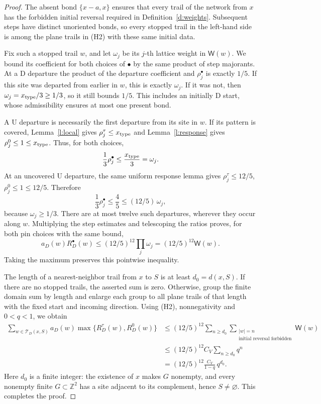 \begin{proof}
The absent bond \(\{x-a,x\}\) ensures that every trail of the
network from \(x\) has the forbidden initial reversal required
in Definition~\ref{d:weights}. Subsequent steps have distinct
unoriented bonds, so every stopped trail in the left-hand side
is among the plane trails in (H2) with these same initial data.

Fix such a stopped trail \(w\), and let \(\omega_j\) be its
\(j\)-th lattice weight in \(\mathsf W(w)\).
We bound its coefficient for both choices of \(\bullet\)
by the same product of step majorants.
At a \(\mathrm D\) departure the product of the departure
coefficient and \(\rho_j^\bullet\) is exactly \(1/5\).
If this site was departed from earlier in \(w\), this is
exactly \(\omega_j\). If it was not, then
\(\omega_j=x_{\rm type}/3\ge1/3\), so it still bounds \(1/5\).
This includes an initially \(\mathrm D\) start, whose
admissibility ensures at most one present bond.

A \(\mathrm U\) departure is necessarily the first departure
from its site in \(w\). If its pattern is covered,
Lemma~\ref{l:local} gives \(\rho_j^\tau\le x_{\rm type}\)
and Lemma~\ref{l:response} gives
\(\rho_j^0\le1\le x_{\rm type}\). Thus, for both choices,
\[
 \frac13\rho_j^\bullet\le\frac{x_{\rm type}}3=\omega_j.
\]
At an uncovered \(\mathrm U\) departure, the same uniform
response lemma gives \(\rho_j^\tau\le12/5\),
\(\rho_j^0\le1\le12/5\). Therefore
\[
 \frac13\rho_j^\bullet\le\frac45
          \le(12/5)\,\omega_j,
\]
because \(\omega_j\ge1/3\).
There are at most twelve such departures, wherever they occur
along \(w\). Multiplying the step estimates and telescoping
the ratios proves, for both pin choices with the same bound,
\[
 a_D(w)R_D^\bullet(w)
   \le(12/5)^{12}\prod_j\omega_j
   =(12/5)^{12}\mathsf W(w).
\]
Taking the maximum preserves this pointwise inequality.

The length of a nearest-neighbor trail from \(x\) to \(S\)
is at least \(d_0=d(x,S)\). If there are no stopped trails,
the asserted sum is zero. Otherwise, group the finite domain
sum by length and enlarge each group to all plane trails
of that length with the fixed start and incoming direction.
Using (H2), nonnegativity and \(0<q<1\), we obtain
\[
 \begin{split}
 \sum_{w\in\mathcal T_D(x,S)}
       a_D(w)\max\{R_D^\tau(w),R_D^0(w)\}
 &\le(12/5)^{12}\sum_{n\ge d_0}
              \sum_{\substack{|w|=n\\
                    \text{initial reversal forbidden}}}\mathsf W(w)\\
 &\le(12/5)^{12}C_V\sum_{n\ge d_0}q^n\\
 &=(12/5)^{12}\frac{C_V}{1-q}\,q^{d_0}.
 \end{split}
\]
Here \(d_0\) is a finite integer: the existence of \(x\) makes
\(G\) nonempty, and every nonempty finite \(G\subset\mathbb Z^2\)
has a site adjacent to its complement, hence \(S\ne\varnothing\).
This completes the proof.
\end{proof}

